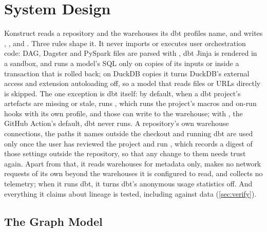 \section{System Design}
\label{sec:design}

Konstruct reads a repository and the warehouses its dbt profiles name,
and writes , ,  and
. Three rules shape it. It never imports or executes user orchestration code:
DAG, Dagster and PySpark files are parsed with , dbt Jinja is rendered in a sandbox, and
 runs a model's SQL only on copies of its inputs or inside a transaction that
is rolled back; on DuckDB copies it turns DuckDB's external access and extension autoloading off, so a
model that reads files or URLs directly is skipped. The one exception is dbt itself: by default, when a dbt project's artefacts are
missing or stale,  runs , which runs the project's
macros and on-run hooks with its own profile, and those can write to the warehouse; with
, the GitHub Action's default, dbt never runs. A repository's own warehouse
connections, the paths it names outside the checkout and running dbt are used only once the user
has reviewed the project and run , which records a digest of those settings
outside the repository, so that any change to them needs trust again. Apart from that, it reads warehouses
for metadata only, makes no network requests of its own beyond the warehouses it is configured to
read, and collects no telemetry; when it runs dbt, it turns dbt's anonymous usage statistics off.
And everything it claims about lineage is tested, including against data (\cref{sec:verify}).

\subsection{The Graph Model}
\label{sec:graph}

